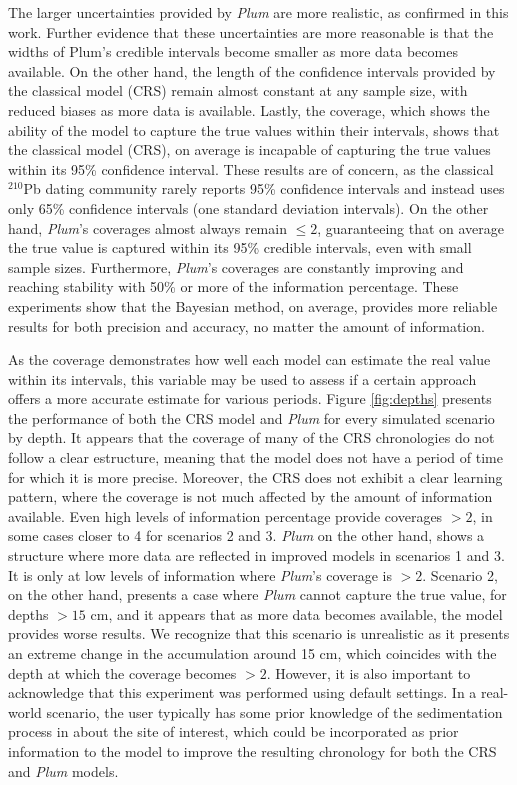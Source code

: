 \documentclass [10pt] {article}
\begin{document}
The larger uncertainties provided by \textit{Plum} are more realistic, as confirmed in this work.
Further evidence that these uncertainties are more reasonable is that the widths of Plum's credible intervals become smaller as more data becomes available.
On the other hand, the length of the confidence intervals provided by the classical model (CRS) remain almost constant at any sample size, with reduced biases as more data is available.
Lastly, the coverage, which shows the ability of the model to capture the true values within their intervals, shows that the classical model (CRS), on average is incapable of capturing the true values within its 95\% confidence interval. 
These results are of concern, as the classical $^{210}$Pb dating community rarely reports 95\% confidence intervals and instead uses only 65\% confidence intervals (one standard deviation intervals).
On the other hand, \textit{Plum}'s coverages almost always remain $\leq 2$, guaranteeing that on average the true value is captured within its 95\% credible intervals, even with small sample sizes.
Furthermore, \textit{Plum}'s coverages are constantly improving and reaching stability with 50\% or more of the information percentage.
These experiments show that the Bayesian method, on average, provides more reliable results for both precision and accuracy, no matter the amount of information.

As the coverage demonstrates how well each model can estimate the real value within its intervals, this variable may be used to assess if a certain approach offers a more accurate estimate for various periods.
Figure \ref{fig:depths} presents the performance of both the CRS model and \textit{Plum} for every simulated scenario by depth.
It appears that the coverage of many of the CRS chronologies do not follow a clear estructure, meaning that the model does not have a period of time for which it is more precise. 
Moreover, the CRS does not exhibit a clear learning pattern, where the coverage is not much affected by the amount of information available.
Even high levels of information percentage provide coverages $> 2$, in some cases closer to 4 for scenarios 2 and 3.
\textit{Plum} on the other hand, shows a structure where more data are reflected in improved models in scenarios 1 and 3.
It is only at low levels of information where \textit{Plum}'s coverage is $>2$.
Scenario 2, on the other hand, presents a case where \textit{Plum} cannot capture the true value, for depths $>15$ cm, and it appears that as more data becomes available, the model provides worse results. 
We recognize that this scenario is unrealistic as it presents an extreme change in the accumulation around 15 cm, which coincides with the depth at which the coverage becomes $>2$.
However, it is also important to acknowledge that this experiment was performed using default settings.  
In a real-world scenario, the user typically has some prior knowledge of the sedimentation process in about the site of interest, which could be incorporated as prior information to the model to improve the resulting chronology for both the CRS and \textit{Plum} models.
\end{document}

